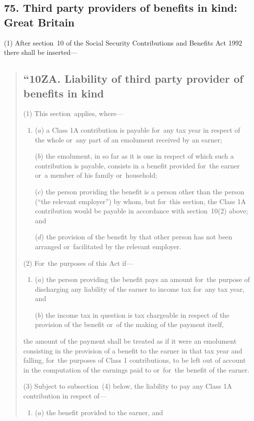 \documentclass[12pt,a4paper]{article}
\begin{document}
\subsection{75. Third party providers of benefits in kind: Great Britain}

(1) After section~10 of the Social Security Contributions and Benefits Act 1992 there shall be inserted—
\begin{quotation}
\subsection*{“10ZA. Liability of third party provider of benefits in kind}

(1) This section~applies, where—
\begin{enumerate}\item[]
($a$) a Class 1A contribution is payable for~any tax year in respect of the whole or~any part of an emolument received by an earner;

($b$) the emolument, in so far as it is one in respect of which such a contribution is payable, consists in a benefit provided for~the earner or~a member of his family or~household;

($c$) the person providing the benefit is a person other than the person (“the relevant employer”) by whom, but for~this section, the Class 1A contribution would be payable in accordance with section~10(2)  above; and

($d$) the provision of the benefit by that other person has not been arranged or~facilitated by the relevant employer.
\end{enumerate}

(2) For~the purposes of this Act if—
\begin{enumerate}\item[]
($a$) the person providing the benefit pays an amount for~the purpose of discharging any liability of the earner to income tax for~any tax year, and

($b$) the income tax in question is tax chargeable in respect of the provision of the benefit or~of the making of the payment itself,
\end{enumerate}
the amount of the payment shall be treated as if it were an emolument consisting in the provision of a benefit to the earner in that tax year and falling, for~the purposes of Class 1 contributions, to be left out of account in the computation of the earnings paid to or~for~the benefit of the earner.

(3) Subject to subsection~(4)  below, the liability to pay any Class 1A contribution in respect of—
\begin{enumerate}\item[]
($a$) the benefit provided to the earner, and


\end{enumerate}
\end{quotation}
\end{document}
